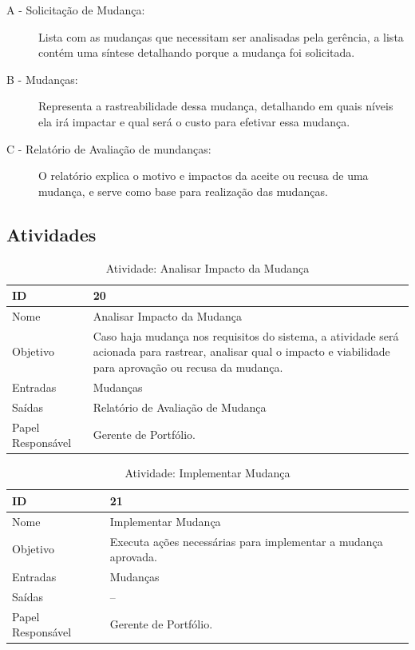 \begin{description}
  \item[A - Solicitação de Mudança: ]
  Lista com as mudanças que necessitam ser analisadas pela gerência, a lista contém
  uma síntese detalhando porque a mudança foi solicitada.
  \item [B - Mudanças: ] Representa a rastreabilidade dessa mudança, detalhando em
  quais níveis ela irá impactar e qual será o custo para efetivar essa mudança.
  \item [C - Relatório de Avaliação de mundanças: ] O relatório explica o motivo e impactos da aceite
  ou recusa de uma mudança, e serve como base para realização das mudanças.
\end{description}

\subsection{Atividades}

\begin{table}[H]
  \centering
    \begin{tabular}{| m{5em} | m{10cm} |}
      \hline
      ID       & 20   \\ \hline
      Nome     & Analisar Impacto da Mudança \\ \hline
      Objetivo & Caso haja mudança nos requisitos do sistema, a atividade será acionada para rastrear, analisar qual o impacto e viabilidade para aprovação ou recusa da mudança.  \\ \hline
      Entradas & Mudanças \\ \hline
      Saídas   & Relatório de Avaliação de Mudança \\ \hline
      Papel Responsável   & Gerente de Portfólio. \\ \hline
    \end{tabular}
    \caption{Atividade: Analisar Impacto da Mudança}
    \label{tabela:atividade20}
\end{table}

\begin{table}[H]
  \centering
    \begin{tabular}{| m{5em} | m{10cm} |}
      \hline
      ID       & 21   \\ \hline
      Nome     & Implementar Mudança \\ \hline
      Objetivo & Executa ações necessárias para implementar a mudança aprovada.  \\ \hline
      Entradas & Mudanças \\ \hline
      Saídas   & -- \\ \hline
      Papel Responsável   & Gerente de Portfólio. \\ \hline
    \end{tabular}
    \caption{Atividade: Implementar Mudança}
    \label{tabela:atividade21}
\end{table}

